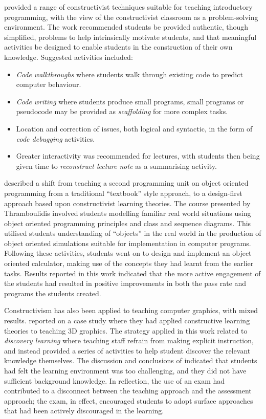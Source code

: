 \citet{VanGorp:2001} provided a range of constructivist techniques suitable for teaching introductory programming, with the view of the constructivist classroom as a problem-solving environment. The work recommended students be provided authentic, though simplified, problems to help intrinsically motivate students, and that meaningful activities be designed to enable students in the construction of their own knowledge. Suggested activities included:

\begin{itemize}[noitemsep,nolistsep]
	\item \emph{Code walkthroughs} where students walk through existing code to predict computer behaviour.
	\item \emph{Code writing} where students produce small programs, small programs or pseudocode may be provided as \emph{scaffolding} for more complex tasks. 
	\item Location and correction of issues, both logical and syntactic, in the form of \emph{code debugging} activities.
	\item Greater interactivity was recommended for lectures, with students then being given time to \emph{reconstruct lecture note} as a summarising activity. 
\end{itemize}


\citet{Thramboulidis:2003,Thramboulidis:2003a,Thramboulidis:2003b} described a shift from teaching a second programming unit on object oriented programming from a traditional ``textbook'' style approach, to a design-first approach based upon constructivist learning theories. The course presented by Thramboulidis involved students modelling familiar real world situations using object oriented programming principles and class and sequence diagrams. This utilised students understanding of ``objects'' in the real world in the production of object oriented simulations suitable for implementation in computer programs. Following these activities, students went on to design and implement an object oriented calculator, making use of the concepts they had learnt from the earlier tasks. Results reported in this work indicated that the more active engagement of the students had resulted in positive improvements in both the pass rate and programs the students created. 

Constructivism has also been applied to teaching computer graphics, with mixed results. \citet{Taxen:2004} reported on a case study where they had applied constructive learning theories to teaching 3D graphics. The strategy applied in this work related to \emph{discovery learning} \cite{Duffy:1996} where teaching staff refrain from making explicit instruction, and instead provided a series of activities to help student discover the relevant knowledge themselves. The discussion and conclusions of \citet{Taxen:2004} indicated that students had felt the learning environment was too challenging, and they did not have sufficient background knowledge. In reflection, the use of an exam had contributed to a disconnect between the teaching approach and the assessment approach; the exam, in effect, encouraged students to adopt surface approaches that had been actively discouraged in the learning.

